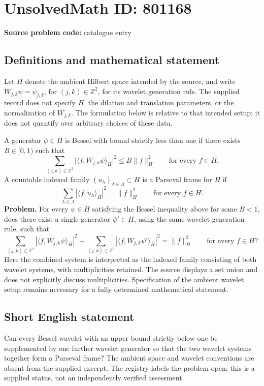 \documentclass[11pt]{article}
\newcommand{\Z}{\mathbb{Z}}
\begin{document}
\section*{UnsolvedMath ID: 801168}
\textbf{Source problem code:} catalogue entry
\subsection{Definitions and mathematical statement}
Let \(H\) denote the ambient Hilbert space intended by the source, and write \(W_{j,k}\psi=\psi_{j,k}\), for \((j,k)\in\Z^2\), for its wavelet generation rule. The supplied record does not specify \(H\), the dilation and translation parameters, or the normalization of \(W_{j,k}\). The formulation below is relative to that intended setup; it does not quantify over arbitrary choices of these data.

A generator \(\psi\in H\) is Bessel with bound strictly less than one if there exists \(B\in[0,1)\) such that
\[
\sum_{(j,k)\in\Z^2}\bigl|\langle f,W_{j,k}\psi\rangle_H\bigr|^2\le B\|f\|_H^2
\qquad\text{for every }f\in H.
\]
A countable indexed family \((u_\lambda)_{\lambda\in\Lambda}\subset H\) is a Parseval frame for \(H\) if
\[
\sum_{\lambda\in\Lambda}|\langle f,u_\lambda\rangle_H|^2=\|f\|_H^2
\qquad\text{for every }f\in H.
\]
\textbf{Problem.} For every \(\psi\in H\) satisfying the Bessel inequality above for some \(B<1\), does there exist a single generator \(\psi'\in H\), using the same wavelet generation rule, such that
\[
\sum_{(j,k)\in\Z^2}|\langle f,W_{j,k}\psi\rangle_H|^2+
\sum_{(j,k)\in\Z^2}|\langle f,W_{j,k}\psi'\rangle_H|^2
=\|f\|_H^2
\qquad\text{for every }f\in H?
\]
Here the combined system is interpreted as the indexed family consisting of both wavelet systems, with multiplicities retained. The source displays a set union and does not explicitly discuss multiplicities. Specification of the ambient wavelet setup remains necessary for a fully determined mathematical statement.
\subsection{Short English statement}
Can every Bessel wavelet with an upper bound strictly below one be supplemented by one further wavelet generator so that the two wavelet systems together form a Parseval frame? The ambient space and wavelet conventions are absent from the supplied excerpt. The registry labels the problem open; this is a supplied status, not an independently verified assessment.
\end{document}
